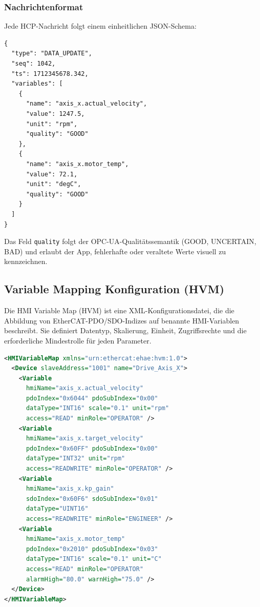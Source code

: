 ﻿\documentclass[12pt,a4paper]{article}
\begin{document}
\subsubsection{Nachrichtenformat}

Jede HCP-Nachricht folgt einem einheitlichen JSON-Schema:

\begin{lstlisting}[language={}, caption={HCP-Nachrichtenformat (Beispiel: DATA\_UPDATE).}]
{
  "type": "DATA_UPDATE",
  "seq": 1042,
  "ts": 1712345678.342,
  "variables": [
    {
      "name": "axis_x.actual_velocity",
      "value": 1247.5,
      "unit": "rpm",
      "quality": "GOOD"
    },
    {
      "name": "axis_x.motor_temp",
      "value": 72.1,
      "unit": "degC",
      "quality": "GOOD"
    }
  ]
}
\end{lstlisting}

Das Feld \texttt{quality} folgt der OPC-UA-Qualitätssemantik (GOOD, UNCERTAIN, BAD)
und erlaubt der App, fehlerhafte oder veraltete Werte visuell zu kennzeichnen.

\subsection{Variable Mapping Konfiguration (HVM)}

Die HMI Variable Map (HVM) ist eine XML-Konfigurationsdatei, die die Abbildung von
EtherCAT-PDO/SDO-Indizes auf benannte HMI-Variablen beschreibt. Sie definiert
Datentyp, Skalierung, Einheit, Zugriffsrechte und die erforderliche Mindestrolle für
jeden Parameter.

\begin{lstlisting}[language=xml, caption={HMI Variable Map (HVM) Konfigurationsbeispiel.}]
<HMIVariableMap xmlns="urn:ethercat:ehae:hvm:1.0">
  <Device slaveAddress="1001" name="Drive_Axis_X">
    <Variable
      hmiName="axis_x.actual_velocity"
      pdoIndex="0x6044" pdoSubIndex="0x00"
      dataType="INT16" scale="0.1" unit="rpm"
      access="READ" minRole="OPERATOR" />
    <Variable
      hmiName="axis_x.target_velocity"
      pdoIndex="0x60FF" pdoSubIndex="0x00"
      dataType="INT32" unit="rpm"
      access="READWRITE" minRole="OPERATOR" />
    <Variable
      hmiName="axis_x.kp_gain"
      sdoIndex="0x60F6" sdoSubIndex="0x01"
      dataType="UINT16"
      access="READWRITE" minRole="ENGINEER" />
    <Variable
      hmiName="axis_x.motor_temp"
      pdoIndex="0x2010" pdoSubIndex="0x03"
      dataType="INT16" scale="0.1" unit="C"
      access="READ" minRole="OPERATOR"
      alarmHigh="80.0" warnHigh="75.0" />
  </Device>
</HMIVariableMap>
\end{lstlisting}
\end{document}
